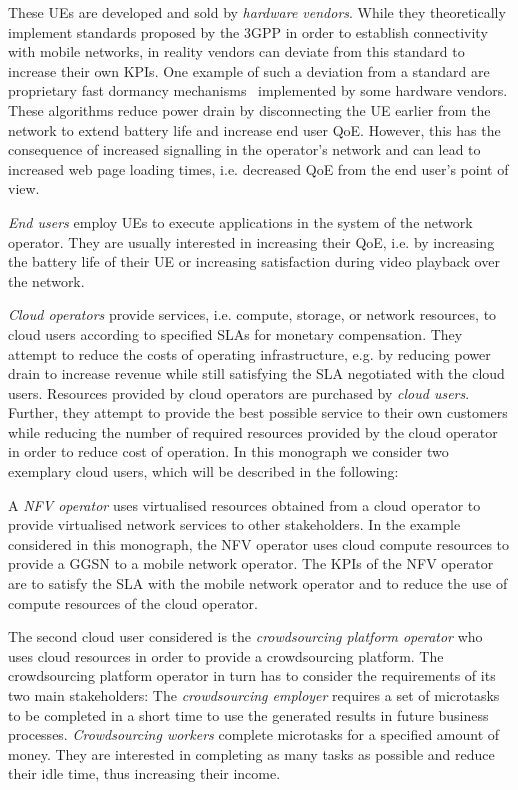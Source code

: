 These \glspl{UE} are developed and sold by \emph{hardware vendors}.
While they theoretically implement standards proposed by the \gls{3GPP} in order to establish connectivity with mobile networks, in reality vendors can deviate from this standard to increase their own \glspl{KPI}.
One example of such a deviation from a standard are proprietary fast dormancy mechanisms~\cite{GSM2010} implemented by some hardware vendors.
These algorithms reduce power drain by disconnecting the \gls{UE} earlier from the network to extend battery life and increase end user \gls{QoE}.
However, this has the consequence of increased signalling in the operator's network and can lead to increased web page loading times, i.e. decreased \gls{QoE} from the end user's point of view.

\emph{End users} employ \glspl{UE} to execute applications in the system of the network operator.
They are usually interested in increasing their \gls{QoE}, i.e. by increasing the battery life of their \gls{UE} or increasing satisfaction during video playback over the network.

\emph{Cloud operators} provide services, i.e. compute, storage, or network resources, to cloud users according to specified \glspl{SLA} for monetary compensation.
They attempt to reduce the costs of operating infrastructure, e.g. by reducing power drain to increase revenue while still satisfying the \gls{SLA} negotiated with the cloud users.
Resources provided by cloud operators are purchased by \emph{cloud users}.
Further, they attempt to provide the best possible service to their own customers while reducing the number of required resources provided by the cloud operator in order to reduce cost of operation. In this monograph we consider two exemplary cloud users, which will be described in the following:

A \emph{\gls{NFV} operator} uses virtualised resources obtained from a cloud operator to provide virtualised network services to other stakeholders.
In the example considered in this monograph, the \gls{NFV} operator uses cloud compute resources to provide a \gls{GGSN} to a mobile network operator.
The \glspl{KPI} of the \gls{NFV} operator are to satisfy the \gls{SLA} with the mobile network operator and to reduce the use of compute resources of the cloud operator.

The second cloud user considered is the \emph{crowdsourcing platform operator} who uses cloud resources in order to provide a crowdsourcing platform.
The crowdsourcing platform operator in turn has to consider the requirements of its two main stakeholders:
The \emph{crowdsourcing employer} requires a set of microtasks to be completed in a short  time to use the generated results in future business processes.
\emph{Crowdsourcing workers} complete microtasks for a specified amount of money.
They are interested in completing as many tasks as possible and reduce their idle time, thus increasing their income.

